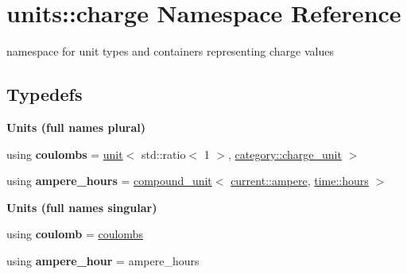 \hypertarget{namespaceunits_1_1charge}{}\section{units\+:\+:charge Namespace Reference}
\label{namespaceunits_1_1charge}


namespace for unit types and containers representing charge values  


\subsection*{Typedefs}
\begin{Indent}{\bf Units (full names plural)}\par
\begin{DoxyCompactItemize}
\item 
\hypertarget{namespaceunits_1_1charge_aa703338bab2b39101c87da5a07ca5e98}{}using {\bfseries coulombs} = \hyperlink{structunits_1_1unit}{unit}$<$ std\+::ratio$<$ 1 $>$, \hyperlink{namespaceunits_1_1category_a2402ebbd5f61c597bf6120629a2582e7}{category\+::charge\+\_\+unit} $>$\label{namespaceunits_1_1charge_aa703338bab2b39101c87da5a07ca5e98}

\item 
\hypertarget{namespaceunits_1_1charge_a430023a3f4f9c664fb4c5cf085dd1c06}{}using {\bfseries ampere\+\_\+hours} = \hyperlink{group___unit_types_ga9c3f6f077dc894620e1ed8358442a8f1}{compound\+\_\+unit}$<$ \hyperlink{structunits_1_1unit}{current\+::ampere}, \hyperlink{structunits_1_1unit}{time\+::hours} $>$\label{namespaceunits_1_1charge_a430023a3f4f9c664fb4c5cf085dd1c06}

\end{DoxyCompactItemize}
\end{Indent}
\begin{Indent}{\bf Units (full names singular)}\par
\begin{DoxyCompactItemize}
\item 
\hypertarget{namespaceunits_1_1charge_aae539946f4f29c961527254237b7f784}{}using {\bfseries coulomb} = \hyperlink{structunits_1_1unit}{coulombs}\label{namespaceunits_1_1charge_aae539946f4f29c961527254237b7f784}

\item 
\hypertarget{namespaceunits_1_1charge_aa5644148dd6833b1cb8a3041505186af}{}using {\bfseries ampere\+\_\+hour} = ampere\+\_\+hours\label{namespaceunits_1_1charge_aa5644148dd6833b1cb8a3041505186af}

\end{DoxyCompactItemize}
\end{Indent}
